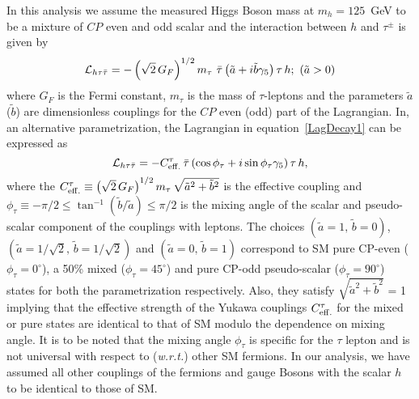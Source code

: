 \documentclass[pdftex,twocolumn,epjc3]{svjour3}          %
\begin{document}
In this analysis we assume the measured Higgs Boson mass at $m_h = 125$~GeV to be a mixture of $CP$ even and odd scalar and the interaction between $h$ and $\tau^\pm$ is given by
%
\begin{equation}
{\cal L}_{h\tau\bar\tau} = -\left(\sqrt{2}\,G_F\right)^{1/2}m_\tau\,\,\bar\tau \left(\tilde{a} + i\tilde{b} \gamma_5 \right)\tau \,h; \,\, (\tilde a > 0) \label{LagDecay1}
\end{equation}
where  $G_F$ is the Fermi constant, $m_{\tau}$ is the mass of $\tau$-leptons and the parameters $\tilde{a}$ ($\tilde{b}$) are  dimensionless couplings for the $CP$ even (odd) part of the Lagrangian. In, an alternative parametrization, the Lagrangian in equation~\eqref{LagDecay1} can be expressed as 
\begin{equation}
{\cal L}_{h\tau\bar\tau} = -C^\tau_{\rm eff.}\,\bar\tau \left(\cos\phi_\tau + i\sin\phi_\tau \gamma_5 \right)\tau \,h, \label{LagDecay2}
\end{equation}
where the $C^\tau_{\rm eff.}\equiv\left(\sqrt{2}\,G_F\right)^{1/2}m_\tau\,\sqrt{\tilde a^2+\tilde b^2} $ is the effective coupling and $\phi_\tau\equiv-{\pi}/{2}\le\tan^{-1}\left({\tilde b}/{\tilde a}\right)\le\pi/2$ %
is the mixing angle of the scalar and pseudo-scalar component of the couplings with leptons. The choices  $(\tilde a =1,\, \tilde b=0)$, $(\tilde a =1/\sqrt{2},\, \tilde b=1/\sqrt{2})$   and $(\tilde a =0,\, \tilde b=1)$  correspond to SM pure CP-even ($\phi_\tau=0^\circ$), a 50\% mixed ($\phi_\tau=45^\circ$) and pure CP-odd pseudo-scalar ($\phi_\tau=90^\circ$) states  for both the parametrization respectively. Also, they satisfy $\sqrt{\tilde a^2 +\tilde b^2}$ = 1 implying that the effective strength of the Yukawa couplings $C^\tau_{\rm eff.}$ for  the mixed or pure states are identical to that of SM modulo the dependence on mixing angle. It is to be noted that the mixing angle $\phi_\tau$ is specific for the $\tau$ lepton and is not universal with respect to ({\it w.r.t.}) other SM fermions. In our analysis, we have assumed all other couplings of the fermions and gauge Bosons with the scalar $h$ to be identical to those of SM.
\end{document}
